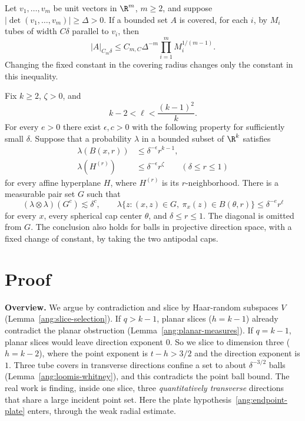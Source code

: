 \documentclass[11pt,reqno]{amsart}
\begin{document}
\begin{lemma}\label{ang:loomis-whitney}
Let $v_1,\ldots,v_m$ be unit vectors in $\R^m$, $m\ge2$, and suppose
$|\det(v_1,\ldots,v_m)|\ge\Delta>0$. If a bounded set $A$ is covered,
for each $i$, by $M_i$ tubes of width $C\delta$ parallel to $v_i$, then
\[
 |A|_{C_m\delta}\le C_{m,C}\Delta^{-m}
       \prod_{i=1}^m M_i^{1/(m-1)}.
\]
Changing the fixed constant in the covering radius changes only the
constant in this inequality.
\end{lemma}

\begin{lemma}\label{ang:weak-radial}
Fix $k\ge2$, $\zeta>0$, and
\[
 k-2<\ell<\frac{(k-1)^2}{k}.
\]
For every $e>0$ there exist $\epsilon,c>0$ with the following property
for sufficiently small $\delta$. Suppose that a probability $\lambda$
in a bounded subset of $\R^k$ satisfies
\begin{align*}
 \lambda(B(x,r))&\le\delta^{-\epsilon}r^{k-1},\\
 \lambda(H^{(r)})&\le\delta^{-\epsilon}r^\zeta
 \qquad(\delta\le r\le1)
\end{align*}
for every affine hyperplane $H$, where $H^{(r)}$ is its $r$-neighborhood.
There is a measurable pair set $G$ such that
\[
 (\lambda\otimes\lambda)(G^c)\lesssim\delta^c,
 \qquad
 \lambda\{z:(x,z)\in G,\ \pi_x(z)\in B(\theta,r)\}
       \le\delta^{-e}r^\ell
\]
for every $x$, every spherical cap center $\theta$, and
$\delta\le r\le1$. The diagonal is omitted from $G$. The conclusion
also holds for balls in projective direction space, with a fixed change
of constant, by taking the two antipodal caps.
\end{lemma}

\section*{Proof}
\noindent\textbf{Overview.} We argue by contradiction and slice by Haar-random subspaces $V$ (Lemma~\ref{ang:slice-selection}). If $q>k-1$, planar slices ($h=k-1$) already contradict the planar obstruction (Lemma~\ref{ang:planar-measures}). If $q=k-1$, planar slices would leave direction exponent $0$. So we slice to dimension three ($h=k-2$), where the point exponent is $t-h>3/2$ and the direction exponent is $1$. Three tube covers in transverse directions confine a set to about $\delta^{-3/2}$ balls (Lemma~\ref{ang:loomis-whitney}), and this contradicts the point ball bound. The real work is finding, inside one slice, three \emph{quantitatively transverse} directions that share a large incident point set. Here the plate hypothesis~\eqref{ang:endpoint-plate} enters, through the weak radial estimate.
\end{document}
